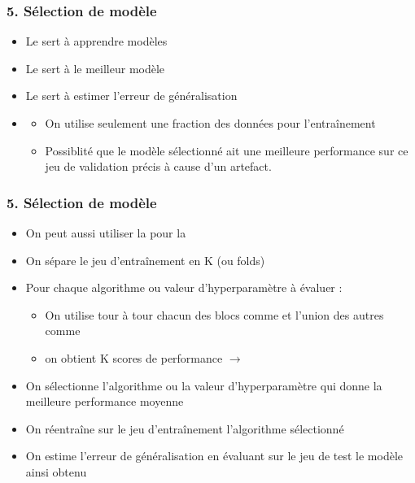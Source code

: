 \begin{frame}
  \begin{center}
  \frametitle{5. Sélection de modèle}
  \end{center}
  \begin{itemize}
  \item Le  sert à apprendre  modèles
  \item Le  sert à  le meilleur modèle
  \item Le  sert à estimer l'erreur de généralisation 
  \pause
  \item {}
    \begin{itemize}
    \item On utilise seulement une fraction des données pour l'entraînement
    \item Possiblité que le modèle sélectionné ait une meilleure performance
      sur ce jeu de validation précis à cause d'un artefact.
    \end{itemize}
  \end{itemize}
\end{frame}

\begin{frame}
  \frametitle{5. Sélection de modèle}
  \begin{itemize}
    \setlength{\itemsep}{3pt}
  \item On peut aussi utiliser la  pour la 
  \item On sépare le jeu d'entraînement en K  (ou folds)
  \item Pour chaque algorithme ou valeur d'hyperparamètre à évaluer :
    \begin{itemize}
    \item On utilise tour à tour chacun des blocs comme  et l'union des autres comme 
  \item[$\Rightarrow$] on obtient K scores de performance $\rightarrow$  
  \end{itemize}
\item On sélectionne l'algorithme ou la valeur d'hyperparamètre qui donne la meilleure performance moyenne
\item On réentraîne sur le jeu d'entraînement l'algorithme sélectionné
\item On estime l'erreur de généralisation en évaluant sur le jeu de test le modèle ainsi obtenu
  \end{itemize}
\end{frame}

